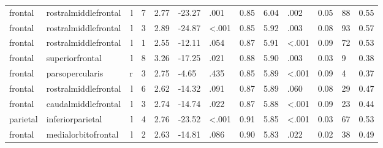 \documentclass{article}
\begin{document}
\begin{longtable}{llrR{1.3cm}R{1cm}R{1.3cm}R{1cm}R{1cm}R{1.3cm}R{1cm}R{1.8cm}R{1.3cm}R{1.8cm}}
   frontal &      rostralmiddlefrontal &    l &         7 &                  2.77 &           -23.27 &               .001 &                               0.85 &                          6.04 &                            .002 &   0.05 &     88 &      0.55 \\
   frontal &      rostralmiddlefrontal &    l &         3 &                  2.89 &           -24.87 &      \textless.001 &                               0.85 &                          5.92 &                            .003 &   0.08 &     93 &      0.57 \\
   frontal &      rostralmiddlefrontal &    l &         1 &                  2.55 &           -12.11 &               .054 &                               0.87 &                          5.91 &                   \textless.001 &   0.09 &     72 &      0.53 \\
   frontal &           superiorfrontal &    l &         8 &                  3.26 &           -17.25 &               .021 &                               0.88 &                          5.90 &                            .003 &   0.03 &      9 &      0.38 \\
   frontal &           parsopercularis &    r &         3 &                  2.75 &            -4.65 &               .435 &                               0.85 &                          5.89 &                   \textless.001 &   0.09 &      4 &      0.37 \\
   frontal &      rostralmiddlefrontal &    l &         6 &                  2.62 &           -14.32 &               .091 &                               0.87 &                          5.89 &                            .060 &   0.08 &     29 &      0.47 \\
   frontal &       caudalmiddlefrontal &    l &         3 &                  2.74 &           -14.74 &               .022 &                               0.87 &                          5.88 &                   \textless.001 &   0.09 &     23 &      0.44 \\
  parietal &          inferiorparietal &    l &         4 &                  2.76 &           -23.52 &      \textless.001 &                               0.91 &                          5.85 &                   \textless.001 &   0.03 &     67 &      0.53 \\
   frontal &       medialorbitofrontal &    l &         2 &                  2.63 &           -14.81 &               .086 &                               0.90 &                          5.83 &                            .022 &   0.02 &     38 &      0.49 \\

\end{longtable}
\end{document}
